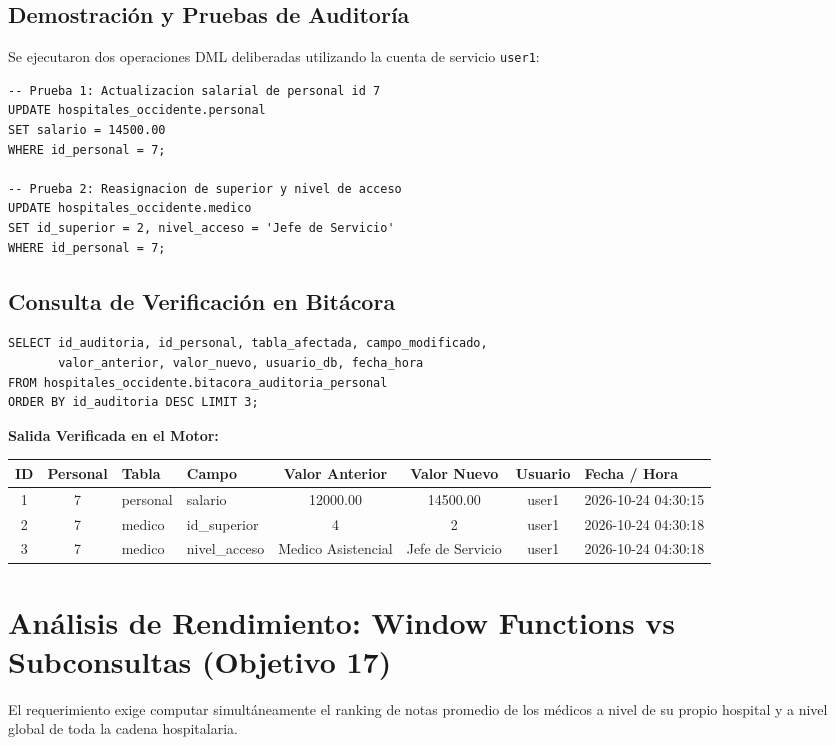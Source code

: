 \documentclass[11pt,a4paper]{article}
\begin{document}
\subsection{Demostración y Pruebas de Auditoría}
Se ejecutaron dos operaciones DML deliberadas utilizando la cuenta de servicio \texttt{user1}:
\begin{lstlisting}[style=sqlstyle]
-- Prueba 1: Actualizacion salarial de personal id 7
UPDATE hospitales_occidente.personal 
SET salario = 14500.00 
WHERE id_personal = 7;

-- Prueba 2: Reasignacion de superior y nivel de acceso
UPDATE hospitales_occidente.medico 
SET id_superior = 2, nivel_acceso = 'Jefe de Servicio' 
WHERE id_personal = 7;
\end{lstlisting}

\subsection{Consulta de Verificación en Bitácora}
\begin{lstlisting}[style=sqlstyle]
SELECT id_auditoria, id_personal, tabla_afectada, campo_modificado, 
       valor_anterior, valor_nuevo, usuario_db, fecha_hora 
FROM hospitales_occidente.bitacora_auditoria_personal 
ORDER BY id_auditoria DESC LIMIT 3;
\end{lstlisting}

\textbf{Salida Verificada en el Motor:}
\begin{table}[H]
\centering
\scriptsize
\begin{tabular}{|c|c|l|l|c|c|c|l|}
\hline
\textbf{ID} & \textbf{Personal} & \textbf{Tabla} & \textbf{Campo} & \textbf{Valor Anterior} & \textbf{Valor Nuevo} & \textbf{Usuario} & \textbf{Fecha / Hora} \\
\hline
1 & 7 & personal & salario & 12000.00 & 14500.00 & user1 & 2026-10-24 04:30:15 \\
2 & 7 & medico & id\_superior & 4 & 2 & user1 & 2026-10-24 04:30:18 \\
3 & 7 & medico & nivel\_acceso & Medico Asistencial & Jefe de Servicio & user1 & 2026-10-24 04:30:18 \\
\hline
\end{tabular}
\end{table}

\newpage

\section{Análisis de Rendimiento: Window Functions vs Subconsultas (Objetivo 17)}
El requerimiento exige computar simultáneamente el ranking de notas promedio de los médicos a nivel de su propio hospital y a nivel global de toda la cadena hospitalaria.
\end{document}
